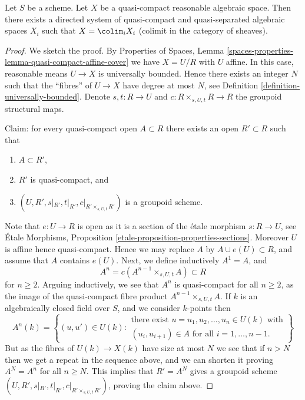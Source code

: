 \begin{lemma}
\label{lemma-fun-property-reasonable}
Let $S$ be a scheme.
Let $X$ be a quasi-compact reasonable algebraic space.
Then there exists a directed system of quasi-compact and quasi-separated
algebraic spaces $X_i$ such that $X = \colim_i X_i$
(colimit in the category of sheaves).
\end{lemma}

\begin{proof}
We sketch the proof. By
Properties of Spaces, Lemma
\ref{spaces-properties-lemma-quasi-compact-affine-cover}
we have $X = U/R$ with $U$ affine.
In this case, reasonable means $U \to X$ is universally bounded.
Hence there exists an integer $N$ such that the ``fibres'' of $U \to X$
have degree at most $N$, see
Definition \ref{definition-universally-bounded}.
Denote $s, t : R \to U$ and $c : R \times_{s, U, t} R \to R$ the
groupoid structural maps.

\medskip\noindent
Claim: for every quasi-compact open $A \subset R$ there exists
an open $R' \subset R$ such that
\begin{enumerate}
\item $A \subset R'$,
\item $R'$ is quasi-compact, and
\item $(U, R', s|_{R'}, t|_{R'}, c|_{R' \times_{s, U, t} R'})$ is
a groupoid scheme.
\end{enumerate}
Note that $e : U \to R$ is open as it is a section of the \'etale morphism
$s : R \to U$, see
\'Etale Morphisms, Proposition \ref{etale-proposition-properties-sections}.
Moreover $U$ is affine hence quasi-compact. Hence we may replace $A$ by
$A \cup e(U) \subset R$, and assume that $A$ contains $e(U)$. Next, we
define inductively $A^1 = A$, and
$$
A^n = c(A^{n - 1} \times_{s, U, t} A) \subset R
$$
for $n \geq 2$. Arguing inductively, we see that $A^n$ is quasi-compact for
all $n \geq 2$, as the image of the quasi-compact fibre product
$A^{n - 1} \times_{s, U, t} A$. If $k$ is an algebraically
closed field over $S$, and we consider $k$-points then
$$
A^n(k) = \left\{(u, u') \in U(k)
:
\begin{matrix}
\text{there exist } u = u_1, u_2, \ldots, u_n \in U(k)\text{ with} \\
(u_i , u_{i + 1}) \in A \text{ for all }i = 1, \ldots, n - 1.
\end{matrix}
\right\}
$$
But as the fibres of $U(k) \to X(k)$ have size at most $N$ we see that if
$n > N$ then we get a repeat in the sequence above, and we can shorten it
proving $A^N = A^n$ for all $n \geq N$.
This implies that $R' = A^N$ gives a groupoid scheme
$(U, R', s|_{R'}, t|_{R'}, c|_{R' \times_{s, U, t} R'})$, proving the claim
above.


\end{proof}
